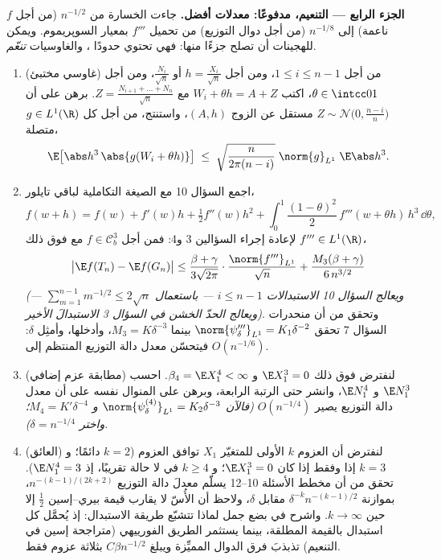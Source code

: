 \begin{problem}
\medskip
\noindent\textbf{الجزء الرابع --- التنعيم، مدفوعًا: معدلات
أفضل.} جاءت الخسارة من $n^{-1/2}$ (من أجل $f$ ناعمة) إلى
$n^{-1/8}$ (من أجل دوال التوزيع) من تحميل $f'''$ بمعيار
السوپريموم. ويمكن للهجينات أن تصلح جزءًا منها: فهي تحتوي حدودًا
، والغاوسيات \emph{تنعّم}.
\begin{enumerate}[resume]
  \item (غاوسي مختبئ) من أجل $1 \leq i \leq n - 1$، ومن أجل $h =
        \frac{X_i}{\sqrt n}$ أو
        $\frac{N_i}{\sqrt n}$، ومن أجل $\theta \in \intcc01$، اكتب $W_i + \theta h = A +
        Z$ مع $Z = \frac{N_{i+1} + \dots + N_n}{\sqrt
        n}$. برهن
        على أن $Z \sim \mathcal N\bigl(0,
        \frac{n-i}n\bigr)$ مستقل عن الزوج $(A,
        h)$، واستنتج، من أجل
        كل $g \in
        L^1(\R)$ متصلة،
        \[
        \E\bigl[\abs h^3\,\abs{g(W_i + \theta h)}\bigr]
        \;\leq\; \sqrt{\frac{n}{2\pi(n - i)}}\;
        \norm{g}_{L^1}\;\E\abs h^3 .
        \]
  \item اجمع السؤال 10 مع الصيغة التكاملية لباقي تايلور،
        \[
        f(w + h) = f(w) + f'(w)h + \tfrac12f''(w)h^2 +
        \int_0^1\frac{(1 - \theta)^2}2\,f'''(w + \theta
        h)\,h^3\,\dd\theta,
        \]
        لإعادة إجراء السؤالين 3 و4: فمن أجل $f \in \mathcal C^3_b$ مع فوق ذلك
        $f''' \in L^1(\R)$،
        \[
        \bigl|\E f(T_n) - \E f(G_n)\bigr| \leq
        \frac{\beta + \gamma}{3\sqrt{2\pi}}\cdot
        \frac{\norm{f'''}_{L^1}}{\sqrt n} +
        \frac{M_3(\beta + \gamma)}{6\,n^{3/2}}
        \]
        \emph{(ويعالج السؤال 10 الاستبدالات $i \leq n - 1$ ---
        باستعمال $\sum_{m=1}^{n-1}m^{-1/2} \leq 2\sqrt n$ --- ويعالج الحدّ الخشن في السؤال 3
        الاستبدالَ الأخير)}. وتحقق من أن منحدرات السؤال 7 تحقق
        $\norm{\psi_\delta'''}_{L^1} = K_1\delta^{-2}$
        بينما $M_3 = K\delta^{-3}$، وأدخلها، وأمثِل $\delta$: فيتحسّن معدل
        دالة التوزيع المنتظم إلى $O(n^{-1/6})$.
  \item (مطابقة عزم إضافي) لنفترض فوق ذلك $\E
        X_1^3 = 0$ و $\beta_4 = \E X_1^4 < \infty$.
        احسب $\E N_1^3$ و $\E N_1^4$، وانشر حتى الرتبة الرابعة،
        وبرهن على المنوال نفسه على أن معدل دالة التوزيع يصير
        $O(n^{-1/4})$ \emph{(فالآن $\norm{\psi_\delta^{(4)}}_{L^1} =
        K_2\delta^{-3}$ و $M_4 = K'\delta^{-4}$؛ واختر
        $\delta = n^{-1/4}$)}.
  \item (العائق) لنفترض أن العزوم $k$ الأولى للمتغيّر $X_1$
        توافق العزوم  ($k = 2$ دائمًا؛ و $k = 3$ إذا
        وفقط إذا كان $\E X_1^3 = 0$؛ و $k \geq 4$ في لا حالة
        تقريبًا، إذ $\E N_1^4 = 3$). تحقق من أن مخطط الأسئلة
        10--12 يسلّم معدلَ دالة التوزيع $n^{-(k-1)/(2k+2)}$، بموازنة
        $\delta^{-k}n^{-(k-1)/2}$ مقابل $\delta$، ولاحظ أن الأُسّ لا يقارب قيمة
        بيري--إسين $\frac12$ إلا حين $k \to
        \infty$. واشرح في بضع
        جمل لماذا تتشبّع طريقة الاستبدال: إذ يُحمَّل كل استبدال
        بالقيمة المطلقة، بينما يستثمر الطريق الفورييهي
        (متراجحة إسين في التنعيم) تذبذبَ فرق الدوال المميِّزة
        ويبلغ $C\beta n^{-1/2}$ بثلاثة عزوم فقط.
\end{enumerate}


\end{problem}
